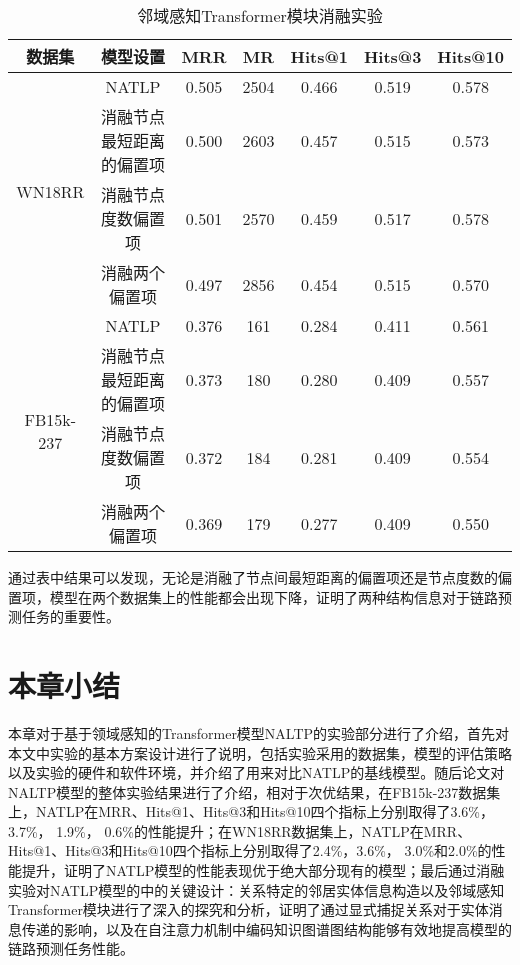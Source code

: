 \begin{table}[htbp]
  \begin{center}
      \caption{邻域感知Transformer模块消融实验}
      \setlength{\tabcolsep}{8pt}
      \renewcommand\arraystretch{1.5}
      \begin{tabular}{*{7}{c}}
          \toprule
          数据集 & 模型设置 & MRR&MR&Hits@1&Hits@3&	Hits@10\\
          \midrule
          \multirow{4}{*}{WN18RR}&NATLP&0.505&2504&0.466&0.519&0.578\\
          &消融节点最短距离的偏置项&0.500&2603&0.457&0.515&0.573\\
          &消融节点度数偏置项&0.501&2570&0.459&0.517&0.578\\
          &消融两个偏置项&0.497&2856&0.454&0.515&0.570\\
          \cmidrule{1-7}
          \multirow{4}{*}{FB15k-237}&NATLP&0.376&161&0.284&0.411&0.561\\
          &消融节点最短距离的偏置项&0.373&180&0.280&0.409&0.557\\
          &消融节点度数偏置项&0.372&184&0.281&0.409&0.554\\
          &消融两个偏置项&0.369&179&0.277&0.409&0.550\\
          \bottomrule
      \end{tabular}
      \label{NATLP_ablation2}
  \end{center}
\end{table}

通过表中结果可以发现，无论是消融了节点间最短距离的偏置项还是节点度数的偏置项，模型在两个数据集上的性能都会出现下降，证明了两种结构信息对于链路预测任务的重要性。


\section{本章小结}

本章对于基于领域感知的Transformer模型NALTP的实验部分进行了介绍，首先对本文中实验的基本方案设计进行了说明，包括实验采用的数据集，模型的评估策略以及实验的硬件和软件环境，并介绍了用来对比NATLP的基线模型。随后论文对NALTP模型的整体实验结果进行了介绍，相对于次优结果，在FB15k-237数据集上，NATLP在MRR、Hits@1、Hits@3和Hits@10四个指标上分别取得了3.6\%，3.7\%， 1.9\%， 0.6\%的性能提升；在WN18RR数据集上，NATLP在MRR、Hits@1、Hits@3和Hits@10四个指标上分别取得了2.4\%，3.6\%， 3.0\%和2.0\%的性能提升，证明了NATLP模型的性能表现优于绝大部分现有的模型；最后通过消融实验对NATLP模型的中的关键设计：关系特定的邻居实体信息构造以及邻域感知Transformer模块进行了深入的探究和分析，证明了通过显式捕捉关系对于实体消息传递的影响，以及在自注意力机制中编码知识图谱图结构能够有效地提高模型的链路预测任务性能。